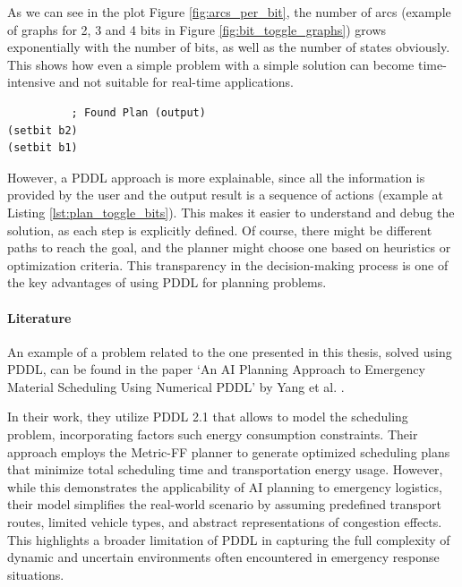 As we can see in the plot Figure \ref{fig:arcs_per_bit}, the number of arcs (example
of graphs for 2, 3 and 4 bits in Figure \ref{fig:bit_toggle_graphs}) grows
exponentially with the number of bits, as well as the number of states obviously.
This shows how even a simple problem with a simple solution can become time-intensive
and not suitable for real-time applications.

\vspace{10mm}
\begin{codewindow}
    \begin{lstlisting}
          ; Found Plan (output)
(setbit b2)
(setbit b1)
\end{lstlisting}
\end{codewindow}
\vspace{10mm}

However, a PDDL approach is more explainable, since all the information is provided
by the user and the output result is a sequence of actions (example at Listing
\ref{lst:plan_toggle_bits}). This makes it easier to understand and debug the
solution, as each step is explicitly defined. Of course, there might be different
paths to reach the goal, and the planner might choose one based on heuristics or
optimization criteria. This transparency in the decision-making process is one of
the key advantages of using PDDL for planning problems.

\paragraph{Literature}
An example of a problem related to the one presented in this thesis, solved using
PDDL, can be found in the paper `An AI Planning Approach to Emergency Material Scheduling
Using Numerical PDDL' by Yang et al. \cite{Yang2022}.

In their work, they utilize PDDL 2.1 that allows to model the scheduling problem,
incorporating factors such energy consumption constraints. Their approach
employs the Metric-FF planner to generate optimized scheduling plans that
minimize total scheduling time and transportation energy usage. However, while
this demonstrates the applicability of AI planning to emergency logistics, their
model simplifies the real-world scenario by assuming predefined transport routes,
limited vehicle types, and abstract representations of congestion effects. This
highlights a broader limitation of PDDL in capturing the full complexity of
dynamic and uncertain environments often encountered in emergency response
situations.

